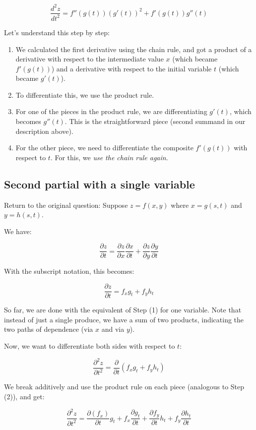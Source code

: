 \documentclass[10pt]{amsart}
\begin{document}
$$\frac{d^2z}{dt^2} = f''(g(t))(g'(t))^2 + f'(g(t))g''(t)$$

Let's understand this step by step:

\begin{enumerate}
\item We calculated the first derivative using the chain rule, and
  got a product of a derivative with respect to the intermediate value
  $x$ (which became $f'(g(t))$) and a derivative with respect to the
  initial variable $t$ (which became $g'(t)$).
\item To differentiate this, we use the product rule.
\item For one of the pieces in the product rule, we are
  differentiating $g'(t)$, which becomes $g''(t)$. This is the
  straightforward piece (second summand in our description above).
\item For the other piece, we need to differentiate the composite
  $f'(g(t))$ with respect to $t$. For this, we {\em use the chain rule
  again}.
\end{enumerate}

\subsection*{Second partial with a single variable}

Return to the original question: Suppose $z = f(x,y)$ where $x = g(s,t)$
and $y = h(s,t)$.

We have:

$$\frac{\partial z}{\partial t} = \frac{\partial z}{\partial x}\frac{\partial x}{\partial t} + \frac{\partial z}{\partial y}\frac{\partial y}{\partial t}$$

With the subscript notation, this becomes:

$$\frac{\partial z}{\partial t} = f_xg_t + f_yh_t$$

So far, we are done with the equivalent of Step (1) for one
variable. Note that instead of just a single produce, we have a sum of
two products, indicating the two paths of dependence (via $x$ and via
$y$).

Now, we want to differentiate both sides with respect to $t$:

$$\frac{\partial^2z}{\partial t^2} = \frac{\partial}{\partial t}\left(f_xg_t + f_yh_t\right)$$

We break additively and use the product rule on each piece (analogous
to Step (2)), and get:

$$\frac{\partial^2z}{\partial t^2} = \frac{\partial(f_x)}{\partial t} g_t + f_x\frac{\partial g_t}{\partial t} + \frac{\partial f_y}{\partial t}h_t + f_y\frac{\partial h_t}{\partial t}$$
\end{document}
